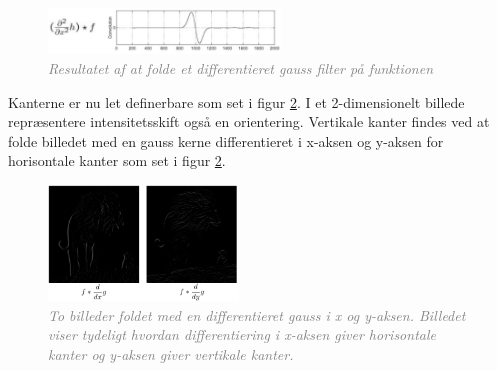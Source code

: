 \begin{figure}[H]
    \centering
    \includegraphics[width=0.55\textwidth]{fig/8.png}
    \vspace{-1em}   
    \begin{center}
    \caption{\textcolor{gray}{\footnotesize \textit{
     Resultatet af at folde et differentieret gauss filter på funktionen}}}
    \label{fig:deriv}
     \end{center}
    \vspace{-2.5em}  
  \end{figure}
\noindent
Kanterne er nu let definerbare som set i figur \ref{fig:deriv}. I et 2-dimensionelt billede repræsentere intensitetsskift også en orientering. Vertikale kanter findes ved at folde billedet med en gauss kerne differentieret i x-aksen og y-aksen for horisontale kanter som set i figur \ref{fig:deriv}.
\begin{figure}[H]
    \centering
    \includegraphics[width=0.45\textwidth]{fig/9.png}
    \vspace{-1em}   
    \begin{center}
    \caption{\textcolor{gray}{\footnotesize \textit{
     To billeder foldet med en differentieret gauss i x og y-aksen. Billedet viser tydeligt hvordan differentiering i x-aksen giver horisontale kanter og y-aksen giver vertikale kanter.}}}
    \label{fig:deriv}
     \end{center}
  \end{figure}
       \vspace{-2.5em} 
\noindent
